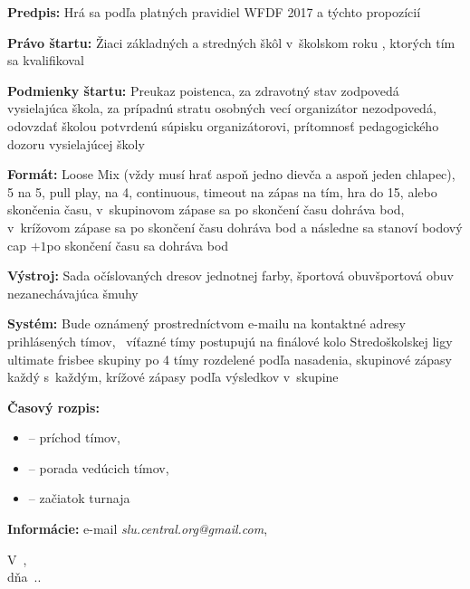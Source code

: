 {\begin{enumerate}[label={\Alph*.},font={\bfseries}]
    \vspace{5pt}
    \textbf{Predpis:} Hrá sa podľa platných pravidiel WFDF 2017 a týchto propozícií\par
    \textbf{Právo štartu:} Žiaci základných a stredných škôl v~školskom roku \the\rok\if\the{}, ktorých tím sa kvalifikoval\fi\par
    \textbf{Podmienky štartu:} Preukaz poistenca, za zdravotný stav zodpovedá vysielajúca škola, za prípadnú stratu osobných vecí organizátor nezodpovedá, odovzdať školou potvrdenú súpisku organizátorovi, prítomnosť pedagogického dozoru vysielajúcej školy\par
    \textbf{Formát:} Loose Mix (vždy musí hrať aspoň jedno dievča a aspoň jeden chlapec), 
    \if\the{}%
    5 na 5, pull play, 
     na 4, continuous, 
     timeout na zápas na tím, hra do 15, alebo skončenia času, \if\the{} v~skupinovom zápase sa po skončení času dohráva bod, v~krížovom zápase sa po skončení času dohráva bod a následne sa stanoví bodový cap $+1$\else po skončení času sa dohráva bod\fi\par
    \textbf{Výstroj:} Sada očíslovaných dresov jednotnej farby, \if\the{} športová obuv\else športová obuv nezanechávajúca šmuhy\par
    \textbf{Systém:} \if\the{} Bude oznámený prostredníctvom e-mailu na kontaktné adresy prihlásených tímov, \the\postupujuci\ víťazné tímy postupujú na finálové kolo Stredoškolskej ligy ultimate frisbee skupiny po 4 tímy rozdelené podľa nasadenia, skupinové zápasy každý s~každým, krížové zápasy podľa výsledkov v~skupine\fi\par
    \textbf{Časový rozpis:} 
    \begin{itemize}
    \setlength{\itemindent}{15pt}
      \item \textbf{\the\casPrichodu} -- príchod tímov, 
      \item \textbf{\the\casPorady} -- porada vedúcich tímov, 
      \item \textbf{\the\zaciatok} -- začiatok turnaja
    \end{itemize}\par
    \textbf{Informácie:} e-mail \textit{slu.central.org@gmail.com}, \the\kontakt\par
\end{enumerate}

\vfill
\begin{minipage}{.2\textwidth}
\begin{center}
    V~\the\vMeste, \\
    dňa~\the\day .\the\month .\the\year
\end{center}
\end{minipage}
\hfill
\begin{minipage}{.25\textwidth}
\begin{center}
    \hrulefill\\
    \the\riaditel
\end{center}
\end{minipage}
}
